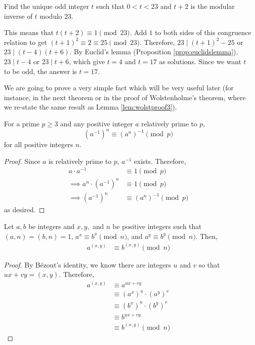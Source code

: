 \begin{problem}
	Find the unique odd integer $t$ such that $0<t<23$ and $t+2$ is the modular inverse of $t$ modulo $23$.
\end{problem}

\begin{solution}
	This means that $t(t+2)\equiv 1 \pmod{23}$. Add $1$ to both sides of this congruence relation to get $(t+1)^2 \equiv 2 \equiv 25\pmod{23}$. Therefore, $23\mid (t+1)^2-25$ or $23\mid (t-4)(t+6)$. By Euclid's lemma (Proposition \ref{prop:euclidslemma}), $23\mid t-4$ or $23\mid t+6$, which give $t=4$ and $t=17$ as solutions. Since we want $t$ to be odd, the answer is $t=17$.
\end{solution}

We are going to prove a very simple fact which will be very useful later (for instance, in the next theorem or in the proof of Wolstenholme's theorem, where we re-state the same result as Lemma \ref{lem:wolstproof3}).

\begin{proposition}\label{prop:inversepower}
	For a prime $p\geq 3$ and any positive integer $a$ relatively prime to $p$,
	\[ (a^{-1})^n \equiv (a^n)^{-1} \pmod p\]
	for all positive integers $n$.
\end{proposition}

\begin{proof}
	Since $a$ is relatively prime to $p$, $a^{-1}$ exists. Therefore,
		\begin{align*}
			a \cdot a^{-1}
				& \equiv 1 \pmod p\\
			\implies a^n \cdot (a^{-1})^n
				& \equiv 1 \pmod p\\
			\implies (a^{-1})^n
				& \equiv (a^n)^{-1} \pmod p
		\end{align*}
	as desired.
\end{proof}



\begin{theorem}\label{thm:modgcd}
Let $a,b$ be integers and $x,y,$ and $n$ be positive integers such that $(a,n)=(b,n)=1$,  $a^x\equiv b^x\pmod n$, and $a^y\equiv b^y\pmod n$. Then,
\begin{align*}
	a^{(x,y)} & \equiv b^{(x,y)}\pmod n
\end{align*}
\end{theorem}

\begin{proof}
By B\'{e}zout's identity, we know there are integers $u$ and $v$ so that $ux+vy=(x,y)$. Therefore,
\begin{align}
	a^{(x,y)} &\equiv a^{ux+vy}\nonumber\\
	&\equiv \left(a^x\right)^u \cdot \left(a^y\right)^v\\
	& \equiv \left(b^x\right)^u \cdot \left(b^y\right)^v\label{eq:modgcd}\\
	&\equiv b^{ux+vy}\\
	& \equiv b^{(x,y)} \pmod n\nonumber
\end{align}
\end{proof}

